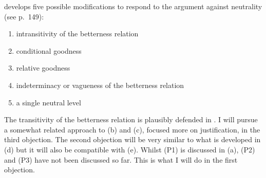 develops five possible modifications to respond to the argument against neutrality (see p.~149):  

\begin{enumerate} 
\item intransitivity of the betterness relation 
\item conditional goodness 
\item relative goodness 
\item indeterminacy or vagueness of the betterness relation \item a single neutral level 
\end{enumerate}
The transitivity of the betterness relation is plausibly defended in . I will pursue a somewhat related approach to (b) and (c), focused more on justification, in the third objection. The second objection will be very similar to what is developed in (d) but it will also be compatible with (e). Whilst (P1) is discussed in (a), (P2) and (P3) have not been discussed so far. This is what I will do in the first objection.  